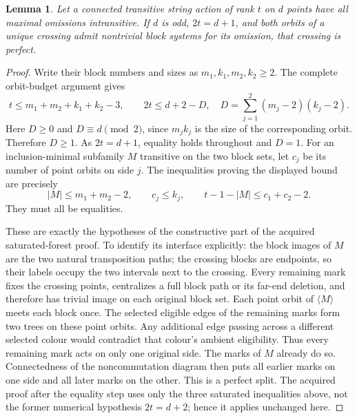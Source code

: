 \documentclass[11pt,a4paper]{article}
\newtheorem{lemma}{Lemma}
\newcommand{\gen}[1]{\langle#1\rangle}
\begin{document}
\begin{lemma}\label{odd}
Let a connected transitive string action of rank $t$ on $d$ points
have all maximal omissions intransitive. If $d$ is odd,
$2t=d+1$, and both orbits of a unique crossing admit nontrivial
block systems for its omission, that crossing is perfect.
\end{lemma}
\begin{proof}
Write their block numbers and sizes as $m_1,k_1,m_2,k_2\ge2$.
The complete orbit-budget argument gives
\[
 t\le m_1+m_2+k_1+k_2-3,
 \qquad
 2t\le d+2-D,
 \quad D=\sum_{j=1}^2(m_j-2)(k_j-2).
\]
Here $D\ge0$ and $D\equiv d\pmod2$, since $m_jk_j$
is the size of the corresponding orbit. Therefore $D\ge1$.
As $2t=d+1$, equality holds throughout and $D=1$.
For an inclusion-minimal subfamily $M$ transitive on the two block
sets, let $c_j$ be its number of point orbits on side $j$.
The inequalities proving the displayed bound are precisely
\[
 |M|\le m_1+m_2-2,\qquad c_j\le k_j,\qquad
 t-1-|M|\le c_1+c_2-2.
\]
They must all be equalities.

These are exactly the hypotheses of the constructive part of the
acquired saturated-forest proof. To identify its interface explicitly:
the block images of $M$ are the two natural transposition paths;
the crossing blocks are endpoints, so their labels occupy the two
intervals next to the crossing. Every remaining mark fixes the crossing
points, centralizes a full block path or its far-end deletion, and
therefore has trivial image on each original block set. Each point
orbit of $\gen M$ meets each block once. The selected eligible edges
of the remaining marks form two trees on these point orbits. Any
additional edge passing across a different selected colour would
contradict that colour's ambient eligibility. Thus every remaining
mark acts on only one original side. The marks of $M$ already do so.
Connectedness of the noncommutation diagram then puts all earlier
marks on one side and all later marks on the other. This is a perfect
split. The acquired proof after the equality step uses only the
three saturated inequalities above, not the former numerical
hypothesis $2t=d+2$; hence it applies unchanged here.
\end{proof}
\end{document}
